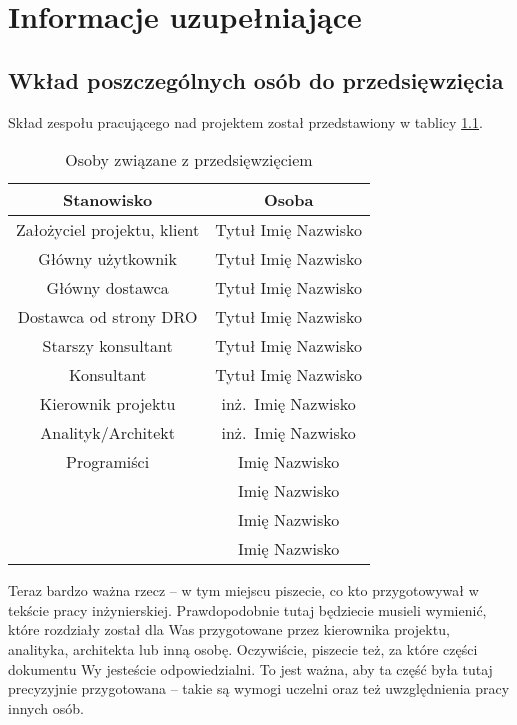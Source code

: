 \chapter{Informacje uzupełniające}
\label{Chapter10}

\section{Wkład poszczególnych osób do przedsięwzięcia}
\label{Chapter101}

Skład zespołu pracującego nad projektem został przedstawiony w tablicy \ref{tab:roster}.

\begin{table}[h]
\centering
\begin{tabular}{ | c | c | }
\hline
\textbf{Stanowisko} & \textbf{Osoba} \\ \hline
Założyciel projektu, klient & Tytuł Imię Nazwisko \\ \hline
Główny użytkownik & Tytuł Imię Nazwisko \\ \hline
Główny dostawca & Tytuł Imię Nazwisko \\ \hline
Dostawca od strony DRO & Tytuł Imię Nazwisko \\ \hline
Starszy konsultant & Tytuł Imię Nazwisko \\ \hline
Konsultant & Tytuł Imię Nazwisko \\ \hline
Kierownik projektu & inż.~Imię Nazwisko \\ \hline
Analityk/Architekt & inż.~Imię Nazwisko \\ \hline
Programiści & Imię Nazwisko \\ 
 & Imię Nazwisko \\ 
 & Imię Nazwisko \\ 
 & Imię Nazwisko \\
\hline
\end{tabular}
\caption{Osoby związane z przedsięwzięciem}\label{tab:roster}
\end{table}

\noindent
Teraz bardzo ważna rzecz -- w tym miejscu piszecie, co kto przygotowywał w tekście pracy inżynierskiej. Prawdopodobnie tutaj będziecie musieli wymienić, które rozdziały został dla Was przygotowane przez kierownika projektu, analityka, architekta lub inną osobę. Oczywiście, piszecie też, za które części dokumentu Wy jesteście odpowiedzialni. To jest ważna, aby ta część była tutaj precyzyjnie przygotowana -- takie są wymogi uczelni oraz też uwzględnienia pracy innych osób.

